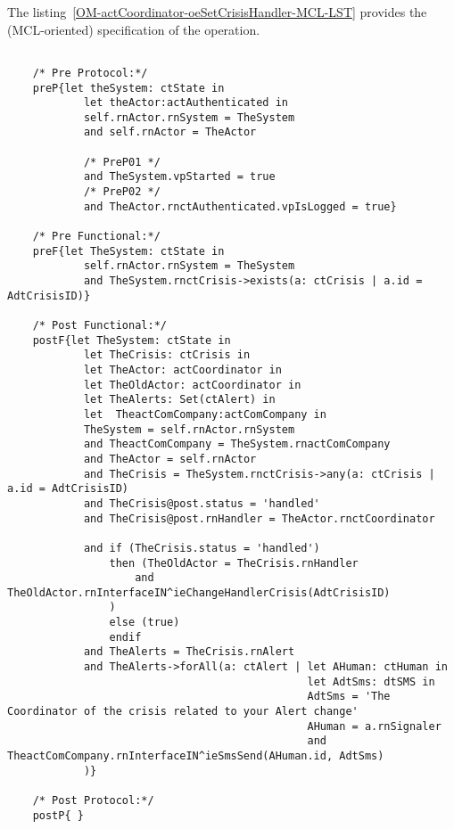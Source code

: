 	\vspace{1cm}
	The listing~\ref{OM-actCoordinator-oeSetCrisisHandler-MCL-LST} provides the \msrmessir (MCL-oriented) specification of the operation.
	
	\scriptsize
	\vspace{0.5cm}
	\begin{lstlisting}[style=MessirStyle,firstnumber=auto,captionpos=b,caption={\msrmessir (MCL-oriented) specification of the operation \emph{oeSetCrisisHandler}.},label=OM-actCoordinator-oeSetCrisisHandler-MCL-LST]

	/* Pre Protocol:*/ 
	preP{let theSystem: ctState in
	  		let theActor:actAuthenticated in
	  		self.rnActor.rnSystem = TheSystem
	  		and self.rnActor = TheActor
	  
			/* PreP01 */
	  		and TheSystem.vpStarted = true
			/* PreP02 */
	  		and TheActor.rnctAuthenticated.vpIsLogged = true}
	
	/* Pre Functional:*/
	preF{let TheSystem: ctState in
			self.rnActor.rnSystem = TheSystem
			and TheSystem.rnctCrisis->exists(a: ctCrisis | a.id = AdtCrisisID)}
	
	/* Post Functional:*/ 
	postF{let TheSystem: ctState in
			let TheCrisis: ctCrisis in
			let TheActor: actCoordinator in
			let TheOldActor: actCoordinator in
			let TheAlerts: Set(ctAlert) in
			let  TheactComCompany:actComCompany in
			TheSystem = self.rnActor.rnSystem
			and TheactComCompany = TheSystem.rnactComCompany
			and TheActor = self.rnActor
			and TheCrisis = TheSystem.rnctCrisis->any(a: ctCrisis | a.id = AdtCrisisID)
			and TheCrisis@post.status = 'handled'
			and TheCrisis@post.rnHandler = TheActor.rnctCoordinator
			
			and if (TheCrisis.status = 'handled')
				then (TheOldActor = TheCrisis.rnHandler
					and TheOldActor.rnInterfaceIN^ieChangeHandlerCrisis(AdtCrisisID)
				)
				else (true)
				endif
			and TheAlerts = TheCrisis.rnAlert
			and TheAlerts->forAll(a: ctAlert | let AHuman: ctHuman in
											   let AdtSms: dtSMS in
											   AdtSms = 'The Coordinator of the crisis related to your Alert change'
											   AHuman = a.rnSignaler
											   and TheactComCompany.rnInterfaceIN^ieSmsSend(AHuman.id, AdtSms)
			)}
	
	/* Post Protocol:*/ 
	postP{ }
	
	\end{lstlisting}
	\normalsize 
	
	
	
	





